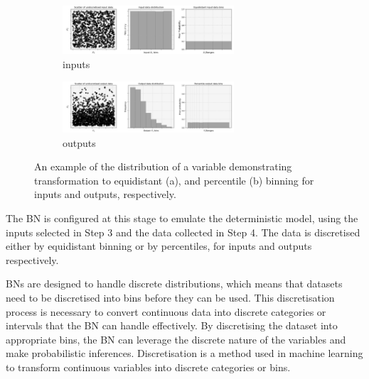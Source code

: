 \documentclass[journal]{IEEEtran}
\begin{document}
\begin{figure}[t]
    \centering
    \begin{minipage}{\textwidth}
        \begin{subfigure}{\textwidth}
            \centering
            \includegraphics[width=0.7\textwidth]{figures/TE_results/march_data/equidistant_binning.png}
            \caption{\small inputs}\label{fig:input_dist_eg}
        \end{subfigure}
    \end{minipage}
    \begin{minipage}{\textwidth}
        \begin{subfigure}{\textwidth}
            \centering
            \includegraphics[width=0.7\textwidth]{figures/TE_results/march_data/percentile_binning.png}
            \caption{\small outputs}\label{fig:output_dist_eg}
        \end{subfigure}
    \end{minipage}
    \caption{\small An example of the distribution of a variable demonstrating transformation to equidistant (a), and percentile (b) binning for inputs and outputs, respectively.}\label{fig:dists_eg}
\end{figure}

The BN is configured at this stage to emulate the deterministic model, using the inputs selected in Step 3 and the data collected in Step 4. The data is discretised either by equidistant binning or by percentiles, for inputs and outputs respectively.

BNs are designed to handle discrete distributions, which means that datasets need to be discretised into bins before they can be used. This discretisation process is necessary to convert continuous data into discrete categories or intervals that the BN can handle effectively. By discretising the dataset into appropriate bins, the BN can leverage the discrete nature of the variables and make probabilistic inferences. Discretisation is a method used in machine learning to transform continuous variables into discrete categories or bins.
\end{document}
